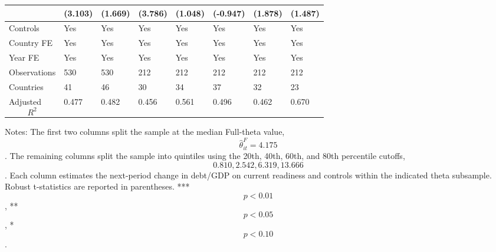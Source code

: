 \begin{table}[H]
\begin{threeparttable}
\begin{tabularx}{\textwidth}{lYYYYYYY}
  & (3.103) & (1.669) & (3.786) & (1.048) & (-0.947) & (1.878) & (1.487) \\
\midrule
Controls & Yes & Yes & Yes & Yes & Yes & Yes & Yes \\
Country FE & Yes & Yes & Yes & Yes & Yes & Yes & Yes \\
Year FE & Yes & Yes & Yes & Yes & Yes & Yes & Yes \\
Observations & 530 & 530 & 212 & 212 & 212 & 212 & 212 \\
Countries & 41 & 46 & 30 & 34 & 37 & 32 & 23 \\
Adjusted $$R^2$$ & 0.477 & 0.482 & 0.456 & 0.561 & 0.496 & 0.462 & 0.670 \\
\bottomrule
\end{tabularx}
\begin{tablenotes}[flushleft]\footnotesize
\item Notes: The first two columns split the sample at the median Full-theta value, $$\widehat{\theta}^{F}_{it}=4.175$$. The remaining columns split the sample into quintiles using the 20th, 40th, 60th, and 80th percentile cutoffs, $$0.810, 2.542, 6.319, 13.666$$. Each column estimates the next-period change in debt/GDP on current readiness and controls within the indicated theta subsample. Robust t-statistics are reported in parentheses. *** $$p<0.01$$, ** $$p<0.05$$, * $$p<0.10$$.
\end{tablenotes}
\end{threeparttable}
\end{table}
